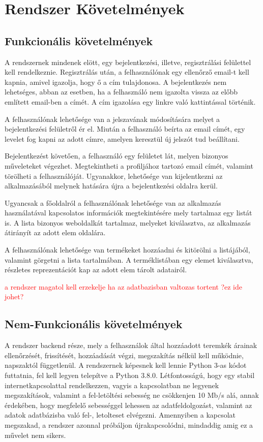 \section{Rendszer Követelmények}

\subsection{Funkcionális követelmények}

A rendszernek mindenek elött, egy bejelentkezési, illetve, regisztrálási felülettel kell rendelkeznie. Regisztrálás után, a felhasználónak egy ellenőrző email-t kell kapnia, amivel igazolja, hogy ő a cím tulajdonosa. A bejelentkezés nem lehetséges, abban az esetben, ha a felhasználó nem igazolta vissza az előbb említett email-ben a címét. A cím igazolása egy linkre való kattintással történik.

A felhasználónak lehetősége van a jelszavának módosítására melyet a bejelentkezési felületről ér el. Miután a felhasználó beírta az email címét, egy levelet fog kapni az adott címre, amelyen keresztül új jelszót tud beállítani.

Bejelentkezést követően, a felhasználó egy felületet lát, melyen bizonyos műveleteket végezhet. Megtekintheti a profiljához tartozó email címét, valamint törölheti a felhasználóját. Ugyanakkor, lehetősége van kijelentkezni az alkalmazásából melynek hatására újra a bejelentkezési oldalra kerül.

Ugyancsak a főoldalról a felhasználónak lehetősége van az alkalmazás használatával kapcsolatos információk megtekintésére mely tartalmaz egy listát is. A lista bizonyos weboldalkát tartalmaz, melyeket kiválasztva, az alkalmazás átirányít az adott elem oldalára.

A felhasználónak lehetősége van termékeket hozzáadni és kitörölni a listájából, valamint görgetni a lista tartalmában. A terméklistában egy elemet kiválasztva, részletes reprezentációt kap az adott elem tárolt adatairól.

\textcolor{red}{a rendszer magatol kell erzekelje ha az adatbazisban valtozas tortent ?ez ide johet?}

\subsection{Nem-Funkcionális követelmények}

A rendszer backend része, mely a felhasználok által hozzáadott teremkék árainak ellenőrzését, frissítését, hozzáadását végzi, megszakítás nélkül kell működnie, napszaktól függetlenül. A rendszernek képesnek kell lennie Python 3-as kódot futtatnia, fel kell legyen telepítve a Python 3.8.0. Létfontosságú, hogy egy stabil internetkapcsolattal rendelkezzen, vagyis a kapcsolatban ne legyenek megszakítások, valamint a fel-letöltési sebesség ne csökkenjen 10 Mb/s alá, annak érdekében, hogy megfelelő sebességgel lehessen az adatfeldolgozást, valamint az adatok adatbázisba való fel-, letolteset elvégezni. Amennyiben a kapcsolat megszakad, a rendszer azonnal próbáljon újrakapcsolódni, mindaddig amig ez a művelet nem sikers.

